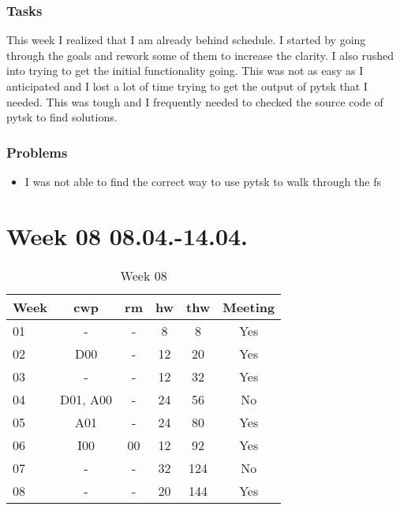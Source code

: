 \subsubsection{Tasks}

This week I realized that I am already behind schedule. I started by going through the goals and rework some of them to increase the clarity. I also rushed into trying to get the initial functionality going. This was not as easy as I anticipated and I lost a lot of time trying to get the output of \gls{pytsk} that I needed. This was tough and I frequently needed to checked the source code of \gls{pytsk} to find solutions. 

\subsubsection{Problems}

\begin{itemize}
    \item I was not able to find the correct way to use \gls{pytsk} to walk through the \gls{fs}
\end{itemize}

\section{Week 08 08.04.-14.04.}
\label{sec:journal:week08}

\begin{table}[!ht]
    \begin{center}
        \caption{Week 08}
        \label{tab:journal:week08}
        \begin{tabular}{l|c|c|c|c|c}
            \textbf{Week} & \textbf{\gls{cwp}} & \textbf{\gls{rm}} & \textbf{\gls{hw}} & \textbf{\gls{thw}} & \textbf{Meeting}\\
        \hline
        01 & - & - & 8 & 8 & Yes \\
        02 & D00 & - & 12 & 20 & Yes \\
        03 & - & - & 12 & 32 & Yes \\
        04 & D01, A00 & - & 24 & 56 & No \\
        05 & A01 & - & 24 & 80 & Yes \\
        06 & I00 & 00 & 12 & 92 & Yes \\
        07 & - & - & 32 & 124 & No \\
        08 & - & - & 20 & 144 & Yes \\
        \end{tabular}
    \end{center}
\end{table}

